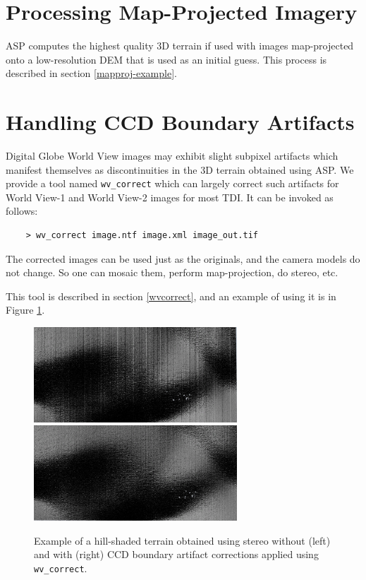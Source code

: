 \section{Processing Map-Projected Imagery}
\label{mapproj}

ASP computes the highest quality 3D terrain if used with images map-projected
onto a low-resolution DEM that is used as an initial guess. This process
is described in section \ref{mapproj-example}.

\section{Handling CCD Boundary Artifacts}
\label{wvcorrect-example}

Digital Globe World View images \cite{digital-globe:camera} may exhibit
slight subpixel artifacts which manifest themselves as discontinuities
in the 3D terrain obtained using ASP. We provide a tool named
\texttt{wv\_correct} which can largely correct such artifacts for World
View-1 and World View-2 images for most TDI. It can be invoked as
follows:

\begin{verbatim}
    > wv_correct image.ntf image.xml image_out.tif
\end{verbatim}

The corrected images can be used just as the originals, and the camera models
do not change. So one can mosaic them, perform map-projection, do
stereo, etc.

This tool is described in section \ref{wvcorrect}, and an example of
using it is in Figure \ref{fig:ccd-artifact-example}.

\begin{figure}[h!]
\centering
  \includegraphics[width=3.0in]{images/examples/ccd_before.png}
  \includegraphics[width=3.0in]{images/examples/ccd_after.png}
\caption{Example of a hill-shaded terrain obtained using stereo without (left) and with (right) CCD boundary artifact corrections applied using \texttt{wv\_correct}.}
\label{fig:ccd-artifact-example}
\end{figure}


